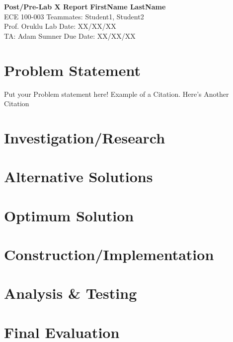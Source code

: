 \documentclass[a4paper, 11pt]{article}
\begin{document}
\noindent
\large\textbf{Post/Pre-Lab X Report} \hfill \textbf{FirstName LastName} \\
\normalsize ECE 100-003 \hfill Teammates: Student1, Student2 \\
Prof. Oruklu \hfill Lab Date: XX/XX/XX \\
TA: Adam Sumner \hfill Due Date: XX/XX/XX

\section*{Problem Statement}
Put your Problem statement here! Example of a Citation\cite[p.219]{Robotics}. Here's Another Citation\cite{Flueck}

\section*{Investigation/Research}
\lipsum[2]

\section*{Alternative Solutions}
\lipsum[3]

\section*{Optimum Solution}
\lipsum[4]

\section*{Construction/Implementation}
\lipsum[5]

\section*{Analysis \& Testing}
\lipsum[6]

\section*{Final Evaluation}
\lipsum[7]
\end{document}
